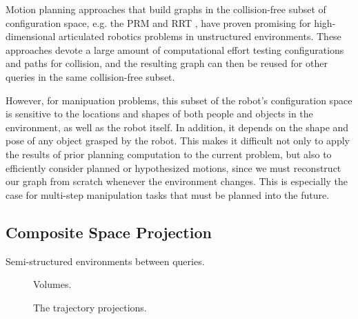 Motion planning approaches that build graphs
in the collision-free subset of
configuration space,
e.g. the
PRM \citep{kavrakietal1996prm}
and RRT \citep{lavallekuffner1999rrt},
have proven promising
for high-dimensional articulated robotics problems
in unstructured environments.
These approaches devote a large amount of computational effort
testing configurations and paths for collision,
and the resulting graph can then be reused
for other queries in the same collision-free subset.

However,
for manipuation problems,
this subset of the robot's configuration space
is sensitive to the locations and shapes of
both people and objects in the environment,
as well as the robot itself.
In addition, it depends on the shape and pose of any object
grasped by the robot.
This makes it difficult not only to apply the results of prior
planning computation to the current problem,
but also to efficiently consider planned or hypothesized motions,
since we must reconstruct our graph from scratch whenever
the environment changes.
This is especially the case for
multi-step manipulation tasks that must be planned into the future.

\subsection{Composite Space Projection}

Semi-structured environments between queries.

\begin{figure}
   \centering
   \caption{Volumes.}
\end{figure}

\begin{figure}
   \centering
   \caption{The trajectory projections.}
\end{figure}


